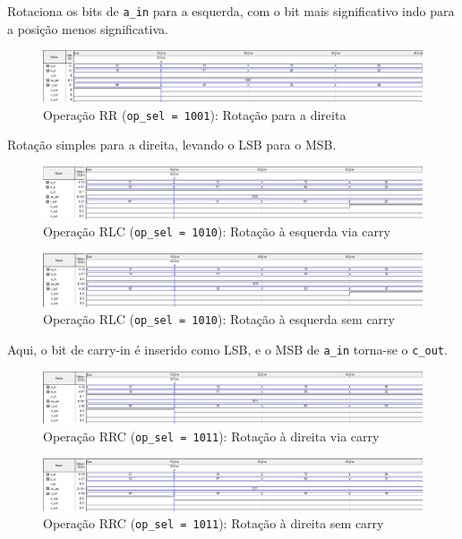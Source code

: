 Rotaciona os bits de \texttt{a\_in} para a esquerda, com o bit mais significativo indo para a posição menos significativa.

\begin{figure}[H]
\centering
\includegraphics[width=\textwidth]{images/alu_1001.png}
\caption{Operação RR (\texttt{op\_sel = 1001}): Rotação para a direita}
\end{figure}

Rotação simples para a direita, levando o LSB para o MSB.

\begin{figure}[H]
\centering
\includegraphics[width=\textwidth]{images/alu_1010_com_carry_in.png}
\caption{Operação RLC (\texttt{op\_sel = 1010}): Rotação à esquerda via carry}
\end{figure}

\begin{figure}[H]
\centering
\includegraphics[width=\textwidth]{images/alu_1010_sem_carry_in.png}
\caption{Operação RLC (\texttt{op\_sel = 1010}): Rotação à esquerda sem carry}
\end{figure}

Aqui, o bit de carry-in é inserido como LSB, e o MSB de \texttt{a\_in} torna-se o \texttt{c\_out}.

\begin{figure}[H]
\centering
\includegraphics[width=\textwidth]{images/alu_1011_com_carry_in.png}
\caption{Operação RRC (\texttt{op\_sel = 1011}): Rotação à direita via carry}
\end{figure}

\begin{figure}[H]
\centering
\includegraphics[width=\textwidth]{images/alu_1011_sem_carry_in.png}
\caption{Operação RRC (\texttt{op\_sel = 1011}): Rotação à direita sem carry}
\end{figure}


